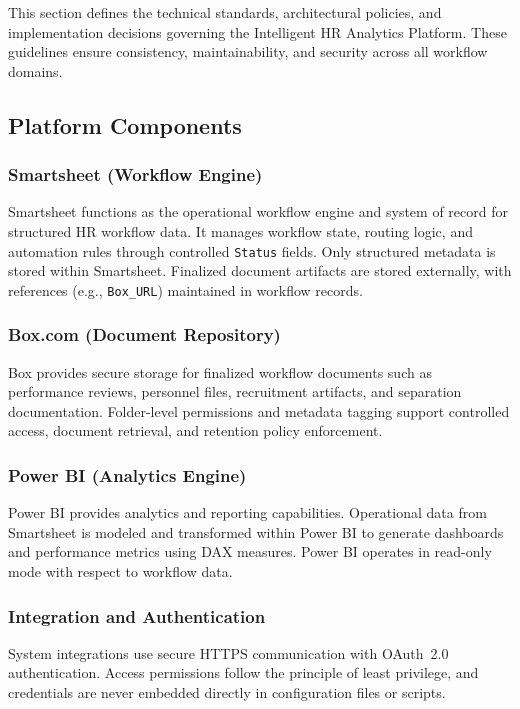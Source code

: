 \documentclass[12pt]{article}
\begin{document}
This section defines the technical standards, architectural policies, and implementation decisions governing the Intelligent HR Analytics Platform. These guidelines ensure consistency, maintainability, and security across all workflow domains.

\subsection{Platform Components}

\subsubsection{Smartsheet (Workflow Engine)}

Smartsheet functions as the operational workflow engine and system of record for structured HR workflow data. It manages workflow state, routing logic, and automation rules through controlled \texttt{Status} fields. Only structured metadata is stored within Smartsheet. Finalized document artifacts are stored externally, with references (e.g., \texttt{Box\_URL}) maintained in workflow records.

\subsubsection{Box.com (Document Repository)}

Box provides secure storage for finalized workflow documents such as performance reviews, personnel files, recruitment artifacts, and separation documentation. Folder-level permissions and metadata tagging support controlled access, document retrieval, and retention policy enforcement.

\subsubsection{Power BI (Analytics Engine)}

Power BI provides analytics and reporting capabilities. Operational data from Smartsheet is modeled and transformed within Power BI to generate dashboards and performance metrics using DAX measures. Power BI operates in read-only mode with respect to workflow data.

\subsubsection{Integration and Authentication}

System integrations use secure HTTPS communication with OAuth~2.0 authentication. Access permissions follow the principle of least privilege, and credentials are never embedded directly in configuration files or scripts.
\end{document}
